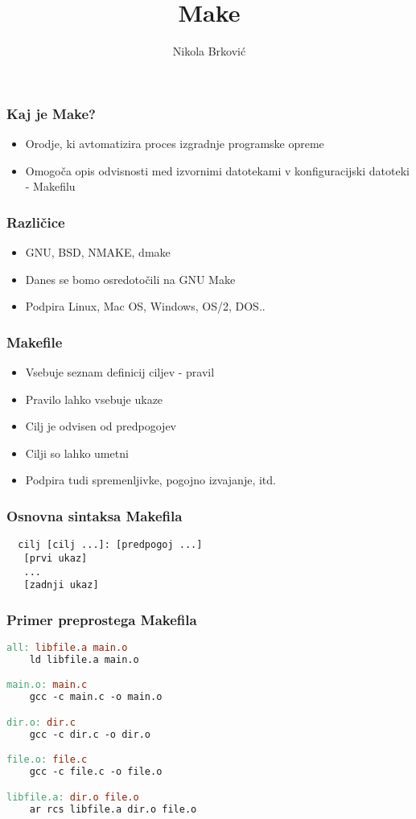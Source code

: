 \documentclass{beamer}
\title{Make}
\author{Nikola Brković}
\begin{document}
\frame{\titlepage}

\begin{frame}
  \frametitle{Kaj je Make?}

  \begin{itemize}
  \item Orodje, ki avtomatizira proces izgradnje programske opreme
  \item Omogoča opis odvisnosti med izvornimi datotekami v
    konfiguracijski datoteki - Makefilu
  \end{itemize}
\end{frame}

\begin{frame}
  \frametitle{Različice}
  
  \begin{itemize}
  \item GNU, BSD, NMAKE, dmake
  \item Danes se bomo osredotočili na GNU Make
  \item Podpira Linux, Mac OS, Windows, OS/2, DOS..
  \end{itemize}
\end{frame}  

\begin{frame}
  \frametitle{Makefile}

  \begin{itemize}
  \item Vsebuje seznam definicij ciljev - pravil
  \item Pravilo lahko vsebuje ukaze
  \item Cilj je odvisen od predpogojev
  \item Cilji so lahko umetni
  \item Podpira tudi spremenljivke, pogojno izvajanje, itd.
  \end{itemize}
\end{frame}

\begin{frame}[fragile]
  \frametitle{Osnovna sintaksa Makefila}
  
\begin{verbatim}
  cilj [cilj ...]: [predpogoj ...]
   [prvi ukaz]
   ...
   [zadnji ukaz]
\end{verbatim}
\end{frame}

\begin{frame}[t, fragile]
  \frametitle{Primer preprostega Makefila}

\begin{lstlisting}[language=make, frame=single]
all: libfile.a main.o
	ld libfile.a main.o

main.o: main.c
	gcc -c main.c -o main.o

dir.o: dir.c
	gcc -c dir.c -o dir.o

file.o: file.c
	gcc -c file.c -o file.o

libfile.a: dir.o file.o
	ar rcs libfile.a dir.o file.o
\end{lstlisting}
\end{frame}
\end{document}
